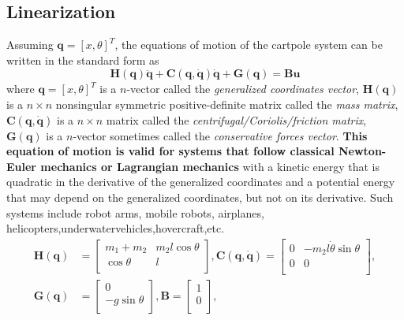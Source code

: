 \subsection{Linearization}
Assuming $\mathbf{q}=[x,\theta]^T$, the equations of motion of the cartpole system can be written in the standard form as
\begin{equation}
    \mathbf{H}(\mathbf{q})\ddot{\mathbf{q}} + \mathbf{C}(\mathbf{q},\mathbf{\dot{q}})\mathbf{\dot{q}} + \mathbf{G}(\mathbf{q}) = \mathbf{B}\mathbf{u}
\end{equation}
where $\mathbf{q}=[x,\theta]^T$ is a $n$-vector called the \textit{generalized coordinates vector}, $\mathbf{H}(\mathbf{q})$ is a $n \times n$ nonsingular symmetric positive-deﬁnite matrix called the \textit{mass matrix}, $\mathbf{C}(\mathbf{q},\mathbf{\dot{q}})$ is a $n \times n$ matrix called the \textit{centrifugal/Coriolis/friction matrix}, $\mathbf{G}(\mathbf{q})$ is a $n$-vector sometimes called the \textit{conservative forces vector}. \textbf{This equation of motion is valid for systems that follow classical Newton-Euler mechanics or Lagrangian mechanics} with a kinetic energy that is quadratic in the derivative of the generalized coordinates and a potential energy that may depend on the generalized coordinates, but not on its derivative. Such systems include robot arms, mobile robots, airplanes, helicopters,underwatervehicles,hovercraft,etc. 
\begin{equation}
\begin{split}
    \mathbf{H}(\mathbf{q}) &= \left[ \begin{array}{cc}
        m_1+m_2 & m_2l\cos\theta \\ 
        \cos\theta & l \\ 
        \end{array} \right], 
    \mathbf{C}(\mathbf{q},\mathbf{\dot{q}}) = \left[ \begin{array}{cc} 
        0 & -m_2l\dot{\theta}\sin\theta \\ 
        0 & 0 \\ 
        \end{array} \right], \\
    \mathbf{G}(\mathbf{q}) &= \left[ \begin{array}{c}
        0 \\ 
        -g\sin\theta \\ 
        \end{array} \right],
    \mathbf{B} = \left[ \begin{array}{c}
        1 \\ 
        0 \\ 
        \end{array} \right],
\end{split}
\end{equation}

